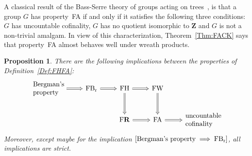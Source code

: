 \documentclass[a4paper]{article}
\newcommand{\PH}[1]{\todo[color={blue!33},size=small]{\textbf{PH :} #1}}
\newtheorem{prop}[lem]{Proposition}
\theoremstyle{definition}
\newcommand*{\field}[1]{\mathbf{#1}}
\newcommand*{\Z}{\field{Z}}
\newcommand*{\FB}{FB\textsubscript{r}}
\newcommand*{\FH}{FH}
\newcommand*{\FW}{FW}
\newcommand*{\FA}{FA}
\newcommand*{\FR}{F\textbf{R}}
\begin{document}
A classical result of the Bass-Serre theory of groups acting on trees~\cite{MR0476875}, is that a group $G$ has property~\FA{} if and only if it satisfies the following three conditions: $G$ has uncountable cofinality, $G$ has no quotient isomorphic to $\Z$ and $G$ is not a non-trivial amalgam.
In view of this characterization, Theorem~\ref{Thm:FACK} says that property~\FA{} almost behaves well under wreath products.
%
%
\begin{prop}\label{Prop:ImplProp}
There are the following implications between the properties of Definition~\ref{Def:FHFA}:
\[
\begin{tikzcd}[arrows=Rightarrow]
\parbox{4.5em}{\textnormal{Bergman's property}}\arrow[r]	&\textnormal{\FB} \arrow[r]	&\textnormal{\FH} \arrow[r]	\arrow[d]&\textnormal{\FW}\arrow[d] &\\%
&&\textnormal{\FR}\arrow[r]& \textnormal{\FA} \arrow[r]& \parbox{5em}{\textnormal{uncountable cofinality}}
\end{tikzcd}
\]
Moreover, except maybe for the implication $[\textnormal{Bergman's property}\implies\textnormal{\FB}]$, all implications are strict.%
\end{prop}
\end{document}
